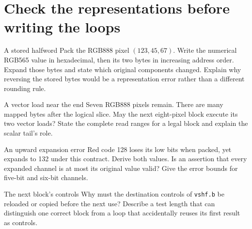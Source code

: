 \section{Check the representations before writing the loops}\label{rgb-questions}
\begin{MARSExercise}{A stored halfword}
  Pack the RGB888 pixel $(123,45,67)$. Write the numerical RGB565 value in hexadecimal,
  then its two bytes in increasing address order. Expand those bytes and state which
  original components changed. Explain why reversing the stored bytes would be a
  representation error rather than a different rounding rule.
\end{MARSExercise}
\begin{MARSExercise}{A vector load near the end}
  Seven RGB888 pixels remain. There are many mapped bytes after the logical slice.
  May the next eight-pixel block execute its two vector loads? State the complete
  read ranges for a legal block and explain the scalar tail's role.
\end{MARSExercise}
\begin{MARSExercise}{An upward expansion error}
  Red code 128 loses its low bits when packed, yet expands to 132 under this contract.
  Derive both values. Is an assertion that every expanded channel is at most its
  original value valid? Give the error bounds for five-bit and six-bit channels.
\end{MARSExercise}
\begin{MARSExercise}{The next block's controls}
  Why must the destination controls of \texttt{vshf.b} be reloaded or copied before
  the next use? Describe a test length that can distinguish one correct block from
  a loop that accidentally reuses its first result as controls.
\end{MARSExercise}
